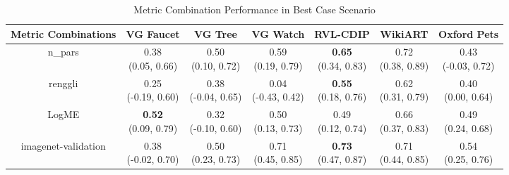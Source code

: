\begin{table}[H]
\centering
\caption{Metric Combination Performance in Best Case Scenario}
\label{tab:main-combo-results}
\setlength\tabcolsep{1.5pt}
\begin{tabular}{c|cccccc}
\textbf{Metric Combinations} & \textbf{VG Faucet} & \textbf{VG Tree} & \textbf{VG Watch} & \textbf{RVL-CDIP} & \textbf{WikiART} & \textbf{Oxford Pets} \\
\hline
n_pars & \makecell{0.38 \\[0pt] (0.05, 0.66)} & \makecell{0.50 \\[0pt] (0.10, 0.72)} & \makecell{0.59 \\[0pt] (0.19, 0.79)} & \makecell{\textbf{0.65} \\[0pt] (0.34, 0.83)} & \makecell{0.72 \\[0pt] (0.38, 0.89)} & \makecell{0.43 \\[0pt] (-0.03, 0.72)} \\
\hline
renggli & \makecell{0.25 \\[0pt] (-0.19, 0.60)} & \makecell{0.38 \\[0pt] (-0.04, 0.65)} & \makecell{0.04 \\[0pt] (-0.43, 0.42)} & \makecell{\textbf{0.55} \\[0pt] (0.18, 0.76)} & \makecell{0.62 \\[0pt] (0.31, 0.79)} & \makecell{0.40 \\[0pt] (0.00, 0.64)} \\
\hline
LogME & \makecell{\textbf{0.52} \\[0pt] (0.09, 0.79)} & \makecell{0.32 \\[0pt] (-0.10, 0.60)} & \makecell{0.50 \\[0pt] (0.13, 0.73)} & \makecell{0.49 \\[0pt] (0.12, 0.74)} & \makecell{0.66 \\[0pt] (0.37, 0.83)} & \makecell{0.49 \\[0pt] (0.24, 0.68)} \\
\hline
imagenet-validation & \makecell{0.38 \\[0pt] (-0.02, 0.70)} & \makecell{0.50 \\[0pt] (0.23, 0.73)} & \makecell{0.71 \\[0pt] (0.45, 0.85)} & \makecell{\textbf{0.73} \\[0pt] (0.47, 0.87)} & \makecell{0.71 \\[0pt] (0.44, 0.85)} & \makecell{0.54 \\[0pt] (0.25, 0.76)} \\

\end{tabular}
\end{table}
